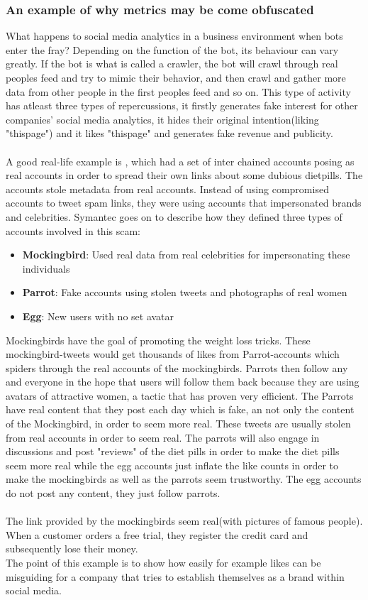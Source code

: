 \newpage
\subsubsection*{An example of why metrics may be come obfuscated}
What happens to social media analytics in a business environment when bots enter the fray? Depending on the function of the bot, its behaviour can vary greatly. If the bot is what is called a crawler, the bot will crawl through real peoples feed and try to mimic their behavior, and then crawl and gather more data from other people in the first peoples feed and so on. This type of activity has atleast three types of repercussions, it firstly generates fake interest for other companies' social media analytics, it hides their original intention(liking "thispage") and it likes "thispage" and generates fake revenue and publicity.
\\
\\
A good real-life example is \cite{Symantec:Narang}, which had a set of inter chained accounts posing as real accounts in order to spread their own links about some dubious dietpills. The accounts stole metadata from real accounts. Instead of using compromised
accounts to tweet spam links, they were using accounts that impersonated brands and
celebrities. Symantec goes on to describe how they defined three types of accounts involved in this scam:
\begin{itemize}
\item {\textbf{Mockingbird}: Used real data from real celebrities for impersonating these individuals}
\item{\textbf{Parrot}: Fake accounts using stolen tweets and photographs of real women}
\item{\textbf{Egg}: New users with no set avatar}
\end{itemize}
Mockingbirds have the goal of promoting the weight loss tricks. These mockingbird-tweets would get thousands of likes from Parrot-accounts which spiders through the real accounts of the mockingbirds. Parrots then follow any and everyone in the hope that users will follow them back because they are using avatars of attractive women, a tactic that has proven very efficient. The Parrots have real content that they post each day which is fake, an not only the content of the Mockingbird, in order to seem more real. These tweets are usually stolen from real accounts in order to seem real.  The parrots will also engage in discussions and post "reviews" of the diet pills in order to make the diet pills seem more real while the egg accounts just inflate the like counts in order to make the mockingbirds as well as the parrots seem trustworthy. The egg accounts do not post any content, they just follow parrots.
\\
\\ The link provided by the mockingbirds seem real(with pictures of famous people). When a customer orders a free trial, they register the credit card and subsequently lose their money. 
\\
The point of this example is to show how easily for example likes can be misguiding for a company that tries to establish themselves as a brand within social media. 



